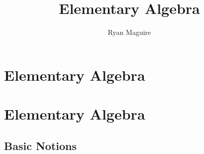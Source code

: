 \documentclass[crop=false,class=book,oneside]{standalone}
\begin{document}
    \ifx\ifmain\undefined
        \title{Elementary Algebra}
        \author{Ryan Maguire}
        \date{\vspace{-5ex}}
        \maketitle
        \tableofcontents
        \setcounter{chapter}{1}
        \chapter{Elementary Algebra}
    \else
        \chapter{Elementary Algebra}
    \fi
    \section{Basic Notions}
\end{document}

